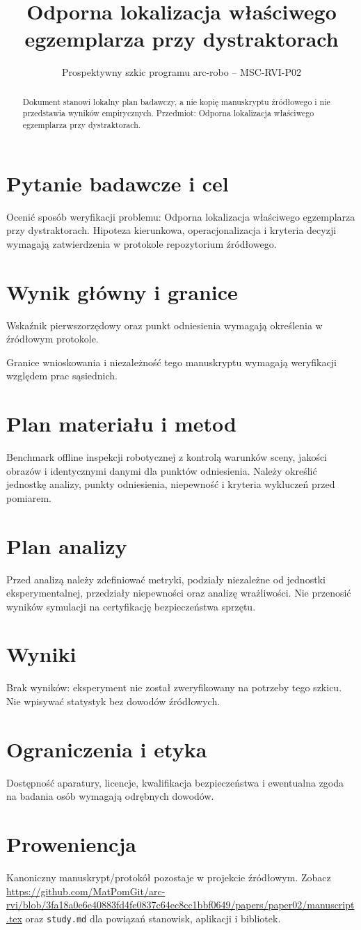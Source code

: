 \documentclass[11pt,a4paper]{article}
\title{Odporna lokalizacja właściwego egzemplarza przy dystraktorach}
\author{}
\date{Prospektywny szkic programu arc-robo -- MSC-RVI-P02}
\begin{document}
\maketitle
\begin{abstract}
Dokument stanowi lokalny plan badawczy, a nie kopię manuskryptu źródłowego i nie przedstawia wyników empirycznych. Przedmiot: Odporna lokalizacja właściwego egzemplarza przy dystraktorach.
\end{abstract}
\section{Pytanie badawcze i cel}
Ocenić sposób weryfikacji problemu: Odporna lokalizacja właściwego egzemplarza przy dystraktorach. Hipoteza kierunkowa, operacjonalizacja i kryteria decyzji wymagają zatwierdzenia w protokole repozytorium źródłowego.
\section{Wynik główny i granice}
Wskaźnik pierwszorzędowy oraz punkt odniesienia wymagają określenia w źródłowym protokole.

Granice wnioskowania i niezależność tego manuskryptu wymagają weryfikacji względem prac sąsiednich.
\section{Plan materiału i metod}
Benchmark offline inspekcji robotycznej z kontrolą warunków sceny, jakości obrazów i identycznymi danymi dla punktów odniesienia. Należy określić jednostkę analizy, punkty odniesienia, niepewność i kryteria wykluczeń przed pomiarem.
\section{Plan analizy}
Przed analizą należy zdefiniować metryki, podziały niezależne od jednostki eksperymentalnej, przedziały niepewności oraz analizę wrażliwości. Nie przenosić wyników symulacji na certyfikację bezpieczeństwa sprzętu.
\section{Wyniki}
Brak wyników: eksperyment nie został zweryfikowany na potrzeby tego szkicu. Nie wpisywać statystyk bez dowodów źródłowych.
\section{Ograniczenia i etyka}
Dostępność aparatury, licencje, kwalifikacja bezpieczeństwa i ewentualna zgoda na badania osób wymagają odrębnych dowodów.
\section{Proweniencja}
Kanoniczny manuskrypt/protokół pozostaje w projekcie źródłowym. Zobacz \url{https://github.com/MatPomGit/arc-rvi/blob/3fa18a0e6e40883fd4fe0837c64ec8cc1bbf0649/papers/paper02/manuscript.tex} oraz \texttt{study.md} dla powiązań stanowisk, aplikacji i bibliotek.
\end{document}
